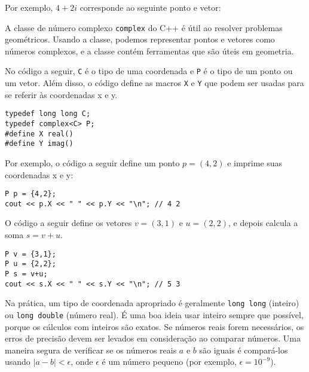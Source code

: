 Por exemplo, $4+2i$ corresponde ao
seguinte ponto e vetor:

\begin{center}
\end{center}


A classe de número complexo \texttt{complex} do C++ é
útil ao resolver problemas geométricos.
Usando a classe, podemos representar pontos e vetores
como números complexos, e a classe contém ferramentas
que são úteis em geometria.

No código a seguir, \texttt{C} é o tipo de
uma coordenada e \texttt{P} é o tipo de um ponto ou um vetor.
Além disso, o código define as macros \texttt{X} e \texttt{Y}
que podem ser usadas para se referir às coordenadas x e y.

\begin{lstlisting}
typedef long long C;
typedef complex<C> P;
#define X real()
#define Y imag()
\end{lstlisting}

Por exemplo, o código a seguir define um ponto $p=(4,2)$
e imprime suas coordenadas x e y:

\begin{lstlisting}
P p = {4,2};
cout << p.X << " " << p.Y << "\n"; // 4 2
\end{lstlisting}

O código a seguir define os vetores $v=(3,1)$ e $u=(2,2)$,
e depois calcula a soma $s=v+u$.

\begin{lstlisting}
P v = {3,1};
P u = {2,2};
P s = v+u;
cout << s.X << " " << s.Y << "\n"; // 5 3
\end{lstlisting}

Na prática,
um tipo de coordenada apropriado é geralmente
\texttt{long long} (inteiro) ou \texttt{long double}
(número real).
É uma boa ideia usar inteiro sempre que possível,
porque os cálculos com inteiros são exatos.
Se números reais forem necessários,
os erros de precisão devem ser levados em consideração
ao comparar números.
Uma maneira segura de verificar se os números reais $a$ e $b$ são iguais
é compará-los usando $|a-b|<\epsilon$,
onde $\epsilon$ é um número pequeno (por exemplo, $\epsilon=10^{-9}$).

